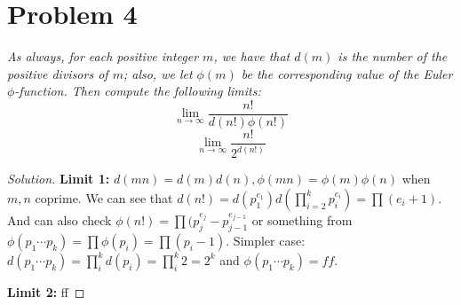 \documentclass{article}
\begin{document}
\section{Problem 4}
{\it As always, for each positive integer $m$,
we have that $d(m)$ is the number of the positive divisors of $m$;
also, we let $\phi(m)$ be the corresponding value of
the Euler $\phi$-function.
Then compute the following limits:
\[
	\lim_{n\to\infty}\frac{n!}{d(n!)\phi(n!)}
\]
\[
	\lim_{n\to\infty} \frac{n!}{2^{d(n!)}}
\]}

\begin{proof}[Solution]
	\hfill\break
	\textbf{Limit 1:}
	$d(mn) = d(m)d(n), \phi(mn)=\phi(m)\phi(n)$ when $m,n$ coprime.
	We can see that $d(n!) = d(p_1^{e_1})d(\prod_{i=2}^kp_i^{e_i})
	= \prod (e_i + 1)$.
	And can also check $\phi(n!) = \prod (p_j^{e_j} - p_{j-1}^{e_{j-1}}$
	or something from $\phi(p_1\cdots p_k) = \prod\phi(p_i) = \prod(p_i-1)$.
	Simpler case: $d(p_1\cdots p_k) = \prod_i^k d(p_i) = \prod_i^k 2 = 2^k$
	and $\phi(p_1\cdots p_k) = ff$.

	\hfill \break
	\noindent\textbf{Limit 2:} ff
\end{proof}
\end{document}
